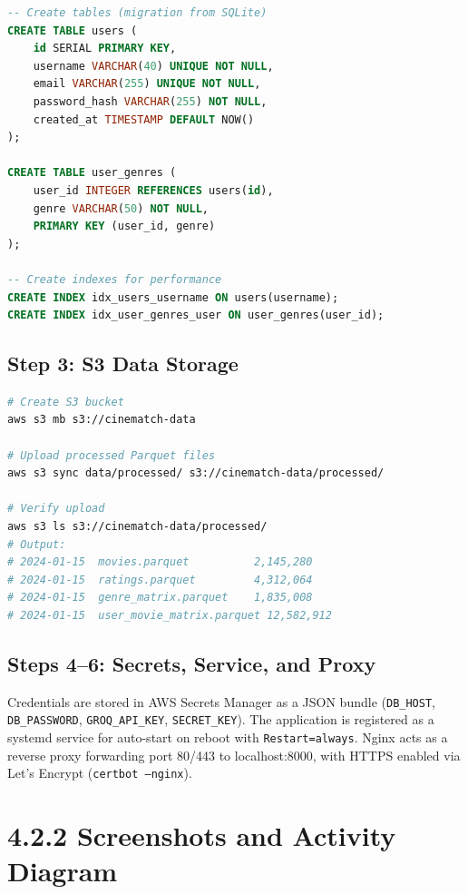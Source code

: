 \documentclass[12pt,a4paper]{report}
\begin{document}
\begin{lstlisting}[language=SQL, caption={PostgreSQL Database Schema on RDS}]
-- Create tables (migration from SQLite)
CREATE TABLE users (
    id SERIAL PRIMARY KEY,
    username VARCHAR(40) UNIQUE NOT NULL,
    email VARCHAR(255) UNIQUE NOT NULL,
    password_hash VARCHAR(255) NOT NULL,
    created_at TIMESTAMP DEFAULT NOW()
);

CREATE TABLE user_genres (
    user_id INTEGER REFERENCES users(id),
    genre VARCHAR(50) NOT NULL,
    PRIMARY KEY (user_id, genre)
);

-- Create indexes for performance
CREATE INDEX idx_users_username ON users(username);
CREATE INDEX idx_user_genres_user ON user_genres(user_id);
\end{lstlisting}

\subsection{Step 3: S3 Data Storage}

\begin{lstlisting}[language=bash, caption={S3 Bucket Setup and Data Upload}]
# Create S3 bucket
aws s3 mb s3://cinematch-data

# Upload processed Parquet files
aws s3 sync data/processed/ s3://cinematch-data/processed/

# Verify upload
aws s3 ls s3://cinematch-data/processed/
# Output:
# 2024-01-15  movies.parquet          2,145,280
# 2024-01-15  ratings.parquet         4,312,064
# 2024-01-15  genre_matrix.parquet    1,835,008
# 2024-01-15  user_movie_matrix.parquet 12,582,912
\end{lstlisting}

\subsection{Steps 4--6: Secrets, Service, and Proxy}

Credentials are stored in AWS Secrets Manager as a JSON bundle (\texttt{DB\_HOST}, \texttt{DB\_PASSWORD}, \texttt{GROQ\_API\_KEY}, \texttt{SECRET\_KEY}). The application is registered as a systemd service for auto-start on reboot with \texttt{Restart=always}. Nginx acts as a reverse proxy forwarding port 80/443 to localhost:8000, with HTTPS enabled via Let's Encrypt (\texttt{certbot --nginx}).

\section{4.2.2 Screenshots and Activity Diagram}
\end{document}
